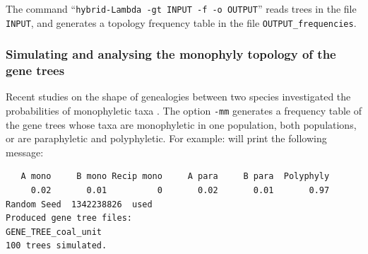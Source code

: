 The command ``{\tt hybrid-Lambda -gt INPUT -f -o OUTPUT}''
reads trees in the file {\tt INPUT}, and generates a topology frequency table in the file {\tt OUTPUT\_frequencies}.

\subsubsection{Simulating and analysing the monophyly topology of the gene trees}
Recent studies on the shape of genealogies between two species investigated the probabilities of monophyletic taxa \citep{Eldon2012,Rosenberg2003}. The option {\tt -mm} generates a frequency table of the gene trees whose taxa are monophyletic in one population, both populations, or are paraphyletic and polyphyletic.
For example:
will print the following message:
\begin{verbatim}
   A mono     B mono Recip mono     A para     B para  Polyphyly
     0.02       0.01          0       0.02       0.01       0.97
Random Seed  1342238826  used
Produced gene tree files:
GENE_TREE_coal_unit
100 trees simulated.
\end{verbatim}




